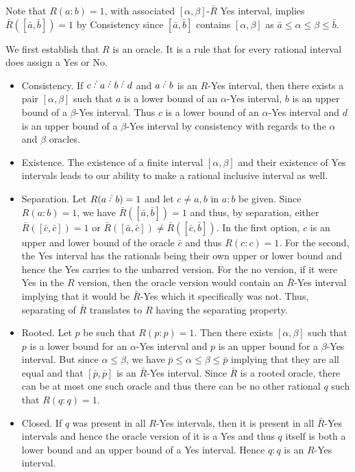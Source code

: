 \documentclass[12pt]{article}
\begin{document}
Note that $R(a:b) = 1$, with associated $[\alpha, \beta]$-$\bar{R}$ Yes interval, implies $\bar{R}([\bar{a}, \bar{b}]) = 1$ by Consistency since $[\bar{a}, \bar{b}]$ contains $[\alpha, \beta]$ as $\bar{a} \leq \alpha \leq \beta \leq \bar{b}$.

We first establish that $R$ is an oracle. It is a rule that for every rational interval does assign a Yes or No. 
\begin{itemize}
    \item Consistency. If $c\lte a \lte b \lte d$ and $a \lte b$ is an $R$-Yes interval, then there exists a pair $[\alpha, \beta]$ such that $a$ is a lower bound of an $\alpha$-Yes interval, $b$ is an upper bound of a $\beta$-Yes interval. Thus $c$ is a lower bound of an $\alpha$-Yes interval and $d$ is an upper bound of a $\beta$-Yes interval by consistency with regards to the $\alpha$ and $\beta$ oracles.
    \item Existence. The existence of a finite interval $[\alpha, \beta]$ and their existence of Yes intervals leads to our ability to make a rational inclusive interval as well. 
    \item Separation. Let $R(a\lte b) = 1$ and let $c \neq a, b$ in $a:b$ be given. Since $R(a:b)= 1$, we have $\bar{R}([\bar{a}, \bar{b}]) = 1$ and  thus, by separation, either $\bar{R}([\bar{c}, \bar{c}]) = 1$ or $\bar{R}([\bar{a}, \bar{c}]) \neq \bar{R}([\bar{c}, \bar{b}])$. In the first option, $c$ is an upper and lower bound of the oracle $\bar{c}$ and thus $R(c:c) =1$. For the second, the Yes interval has the rationals being their own upper or lower bound and hence the Yes carries to the unbarred version. For the no version, if it were Yes in the $R$ version, then the oracle version would contain an $\bar{R}$-Yes interval implying that it would be $\bar{R}$-Yes which it specifically was not. Thus, separating of $\bar{R}$ translates to $R$ having the separating property. 
    \item Rooted. Let $p$ be such that $R(p:p)=1$. Then there exists $[\alpha, \beta]$ such that $p$ is a lower bound for an $\alpha$-Yes interval and $p$ is an upper bound for a $\beta$-Yes interval. But since $\alpha \leq \beta$, we have $\bar{p} \leq \alpha \leq \beta \leq \bar{p}$ implying that they are all equal and that $[\bar{p}, \bar{p}]$ is an $\bar{R}$-Yes interval. Since $\bar{R}$ is a rooted oracle, there can be at most one such oracle and thus there can be no other rational $q$ such that $R(q:q) = 1$.
    \item Closed. If $q$ was present in all $R$-Yes intervals, then it is present in all $\bar{R}$-Yes intervals and hence the oracle version of it is a Yes and thus $q$ itself is both a lower bound and an upper bound of a Yes interval. Hence $q:q$ is an $R$-Yes interval.
\end{itemize}
\end{document}
